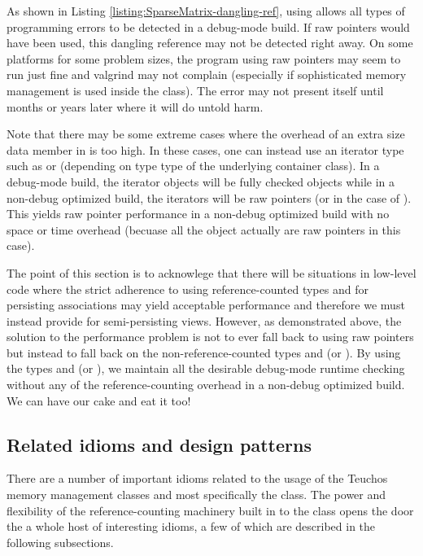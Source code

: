 \documentclass[pdf,ps2pdf,11pt]{SANDreport}
\begin{document}
As shown in Listing {}\ref{listing:SparseMatrix-dangling-ref}, using
{} allows all types of programming errors to be
detected in a debug-mode build.  If raw pointers would have been used,
this dangling reference may not be detected right away.  On some
platforms for some problem sizes, the program using raw pointers may
seem to run just fine and valgrind may not complain (especially if
sophisticated memory management is used inside the
{} class).  The error may not present itself
until months or years later where it will do untold harm.

Note that there may be some extreme cases where the overhead of an
extra size data member in {} is too high.  In these
cases, one can instead use an iterator type such as
{} or {} (depending
on type type of the underlying container class).  In a debug-mode
build, the iterator objects will be fully checked {}
objects while in a non-debug optimized build, the iterators will be
raw pointers (or {} in the case of
{}).  This yields raw pointer performance in a
non-debug optimized build with no space or time overhead (becuase all
the object actually are raw pointers in this case).

The point of this section is to acknowlege that there will be
situations in low-level code where the strict adherence to using
reference-counted types {} and {} for
persisting associations may yield acceptable performance and therefore
we must instead provide for semi-persisting views.  However, as
demonstrated above, the solution to the performance problem is not to
ever fall back to using raw pointers but instead to fall back on the
non-reference-counted types {} and {}
(or {}).  By using the types
{} and {} (or
{}), we maintain all the desirable
debug-mode runtime checking without any of the reference-counting
overhead in a non-debug optimized build.  We can have our cake and eat
it too!


%
{}\subsection{Related idioms and design patterns}
%

There are a number of important idioms related to the usage of the
Teuchos memory management classes and most specifically the
{} class.  The power and flexibility of the
reference-counting machinery built in to the {} class
opens the door the a whole host of interesting idioms, a few of which
are described in the following subsections.
\end{document}
